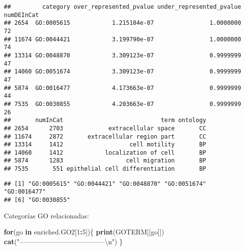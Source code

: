 \documentclass[
]{article}
\newenvironment{Shaded}{\begin{snugshade}}{\end{snugshade}}
\newcommand{\CharTok}[1]{\textcolor[rgb]{0.31,0.60,0.02}{#1}}
\newcommand{\ControlFlowTok}[1]{\textcolor[rgb]{0.13,0.29,0.53}{\textbf{#1}}}
\newcommand{\DataTypeTok}[1]{\textcolor[rgb]{0.13,0.29,0.53}{#1}}
\newcommand{\DecValTok}[1]{\textcolor[rgb]{0.00,0.00,0.81}{#1}}
\newcommand{\KeywordTok}[1]{\textcolor[rgb]{0.13,0.29,0.53}{\textbf{#1}}}
\newcommand{\NormalTok}[1]{#1}
\newcommand{\OperatorTok}[1]{\textcolor[rgb]{0.81,0.36,0.00}{\textbf{#1}}}
\newcommand{\StringTok}[1]{\textcolor[rgb]{0.31,0.60,0.02}{#1}}
\begin{document}
\begin{verbatim}
##         category over_represented_pvalue under_represented_pvalue numDEInCat
## 2654  GO:0005615            1.215104e-07                1.0000000         72
## 11674 GO:0044421            3.199790e-07                1.0000000         74
## 13314 GO:0048870            3.309123e-07                0.9999999         47
## 14060 GO:0051674            3.309123e-07                0.9999999         47
## 5874  GO:0016477            4.173663e-07                0.9999999         44
## 7535  GO:0030855            4.203663e-07                0.9999999         26
##       numInCat                            term ontology
## 2654      2703             extracellular space       CC
## 11674     2872       extracellular region part       CC
## 13314     1412                   cell motility       BP
## 14060     1412            localization of cell       BP
## 5874      1283                  cell migration       BP
## 7535       551 epithelial cell differentiation       BP
\end{verbatim}

\begin{Shaded}
\end{Shaded}

\begin{verbatim}
## [1] "GO:0005615" "GO:0044421" "GO:0048870" "GO:0051674" "GO:0016477"
## [6] "GO:0030855"
\end{verbatim}

Categorías GO relacionadas:

\begin{Shaded}
\begin{Highlighting}[]
\ControlFlowTok{for}\NormalTok{(go }\ControlFlowTok{in}\NormalTok{ enriched.GO2[}\DecValTok{1}\OperatorTok{:}\DecValTok{5}\NormalTok{])\{}
  \KeywordTok{print}\NormalTok{(GOTERM[[go]])}
  \KeywordTok{cat}\NormalTok{(}\StringTok{"--------------------------------------}\CharTok{\textbackslash{}n}\StringTok{"}\NormalTok{)}
\NormalTok{  \}}
\end{Highlighting}
\end{Shaded}
\end{document}
